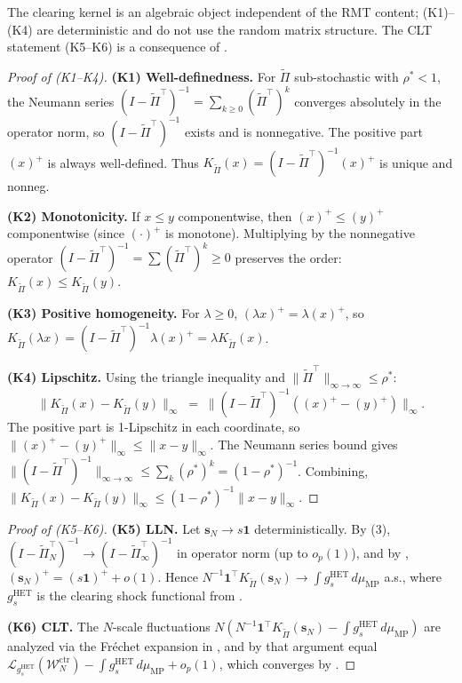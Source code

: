 \documentclass[11pt,a4paper]{article}
\theoremstyle{definition}
\newcommand{\WN}{\mathcal{W}_N^{\mathrm{ctr}}}
\newcommand{\rhoStar}{\rho^\ast}
\newcommand{\muMP}{\mu_{\mathrm{MP}}}
\newcommand{\Lcal}{\mathcal{L}}
\newcommand{\Kcal}{K_{\widetilde{\Pi}}}
\newcommand{\HET}{\mathrm{HET}}
\begin{document}
The clearing kernel is an algebraic object independent of the RMT content;
(K1)--(K4) are deterministic and do not use the random
matrix structure. The CLT statement (K5--K6) is a consequence of
.

\begin{proof}[Proof of  (K1--K4)]
\textbf{(K1) Well-definedness.} For $\widetilde\Pi$ sub-stochastic with
$\rhoStar < 1$, the Neumann series $(I - \widetilde\Pi^\top)^{-1} =
\sum_{k\geq 0}(\widetilde\Pi^\top)^k$ converges absolutely in the operator
norm, so $(I - \widetilde\Pi^\top)^{-1}$ exists and is nonnegative. The
positive part $(x)^+$ is always well-defined. Thus $\Kcal(x) =
(I - \widetilde\Pi^\top)^{-1}(x)^+$ is unique and nonneg.

\textbf{(K2) Monotonicity.} If $x\leq y$ componentwise, then $(x)^+\leq(y)^+$
componentwise (since $(\cdot)^+$ is monotone). Multiplying by the nonnegative
operator $(I - \widetilde\Pi^\top)^{-1} = \sum(\widetilde\Pi^\top)^k\geq 0$
preserves the order: $\Kcal(x)\leq\Kcal(y)$.

\textbf{(K3) Positive homogeneity.} For $\lambda\geq 0$,
$(\lambda x)^+ = \lambda(x)^+$, so
$\Kcal(\lambda x) = (I - \widetilde\Pi^\top)^{-1}\lambda(x)^+ = \lambda\Kcal(x)$.

\textbf{(K4) Lipschitz.} Using the triangle inequality and
$\|\widetilde\Pi^\top\|_{\infty\to\infty}\leq\rhoStar$:
\[
\|\Kcal(x) - \Kcal(y)\|_\infty\;=\;\|(I - \widetilde\Pi^\top)^{-1}((x)^+ - (y)^+)\|_\infty.
\]
The positive part is 1-Lipschitz in each coordinate, so
$\|(x)^+ - (y)^+\|_\infty\leq\|x - y\|_\infty$. The Neumann series bound gives
$\|(I - \widetilde\Pi^\top)^{-1}\|_{\infty\to\infty}\leq\sum_k(\rhoStar)^k = (1 - \rhoStar)^{-1}$.
Combining, $\|\Kcal(x) - \Kcal(y)\|_\infty\leq(1-\rhoStar)^{-1}\|x - y\|_\infty$.
\end{proof}

\begin{proof}[Proof of  (K5--K6)]
\textbf{(K5) LLN.} Let $\mathbf s_N\to s\mathbf 1$ deterministically. By
(3), $(I - \widetilde\Pi_N^\top)^{-1}\to(I - \widetilde\Pi_\infty^\top)^{-1}$
in operator norm (up to $o_p(1)$), and by ,
$(\mathbf s_N)^+ = (s\mathbf 1)^+ + o(1)$. Hence
$N^{-1}\mathbf 1^\top\Kcal(\mathbf s_N)\to\int g_s^{\HET}\,d\muMP$ a.s., where
$g_s^{\HET}$ is the clearing shock functional from .

\textbf{(K6) CLT.} The $N$-scale fluctuations
$N(N^{-1}\mathbf 1^\top\Kcal(\mathbf s_N) - \int g_s^{\HET}\,d\muMP)$ are
analyzed via the Fr\'echet expansion in , and by that
argument equal $\Lcal_{g_s^{\HET}}(\WN) - \int g_s^{\HET}\,d\muMP + o_p(1)$,
which converges by .
\end{proof}
\end{document}
